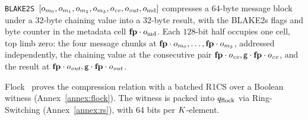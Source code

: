 \texttt{BLAKE2S}\ $[o_{m_0},o_{m_1},o_{m_2},o_{m_3},o_{\mathit{cv}},o_{\mathit{out}},o_{\mathrm{md}}]$ compresses a $64$-byte message block under a $32$-byte chaining value into a $32$-byte result, with the BLAKE2s flags and byte counter in the metadata cell $\mathbf{fp}\cdot o_{\mathrm{md}}$. Each $128$-bit half occupies one cell, top limb zero: the four message chunks at $\mathbf{fp}\cdot o_{m_0},\dots,\mathbf{fp}\cdot o_{m_3}$, addressed independently, the chaining value at the consecutive pair $\mathbf{fp}\cdot o_{\mathit{cv}},\mathsf{g}\cdot\mathbf{fp}\cdot o_{\mathit{cv}}$, and the result at $\mathbf{fp}\cdot o_{\mathit{out}},\mathsf{g}\cdot\mathbf{fp}\cdot o_{\mathit{out}}$.

Flock~\cite{Flock26} proves the compression relation with a batched R1CS over a Boolean witness (Annex~\ref{annex:flock}). The witness is packed into $q_{\mathrm{flock}}$ via Ring-Switching (Annex~\ref{annex:rs}), with $64$ bits per $K$-element.

